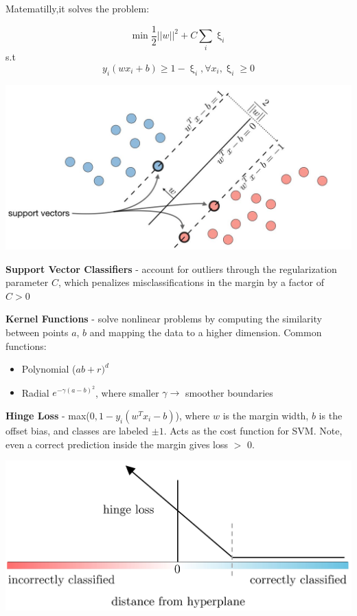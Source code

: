 \documentclass[10pt,landscape]{article}
\begin{document}
\begin{multicols}{3}
    Matematilly,it solves the problem:

    $$\min \frac{1}{2}||w||^2 + C \sum_i \upxi_i $$
    s.t $$y_i(wx_i+b)\geq 1-\upxi_i, \forall x_i, \upxi_i\geq 0 $$
    \vspace{-2.5mm}
    \begin{center}
        \includegraphics[scale = .23]{images/svmNew2.JPG}
    \end{center}

    \vspace{-2mm}
    \textbf{Support Vector Classifiers} - account for outliers through the regularization parameter $C$, which penalizes misclassifications in the margin by a factor of $C > 0$

    \textbf{Kernel Functions} - solve nonlinear problems by computing the similarity between points $a$, $b$ and mapping the data to a higher dimension. Common functions:
    \begin{itemize}[label={--},leftmargin=4mm]
        \vspace{-1mm}
        \itemsep -.4mm
        \item Polynomial ($ab + r)^d$
        \item Radial $e^{-\gamma(a-b)^2}$, where smaller $\gamma \to$  smoother boundaries
    \end{itemize}

    \textbf{Hinge Loss} - max($0,1-y_i(w^T x_i - b)$), where
    $w$ is the margin width, $b$ is the offset bias, and classes are labeled $\pm1$. Acts as the cost function for SVM. Note, even a correct prediction inside the margin gives loss $>$ 0.
    \vspace{-1mm}
    \begin{center}
        \includegraphics[scale = .105]{images/hingeloss3.JPG}
    \end{center}
    \vspace{-3.5mm}

\end{multicols}
\end{document}
